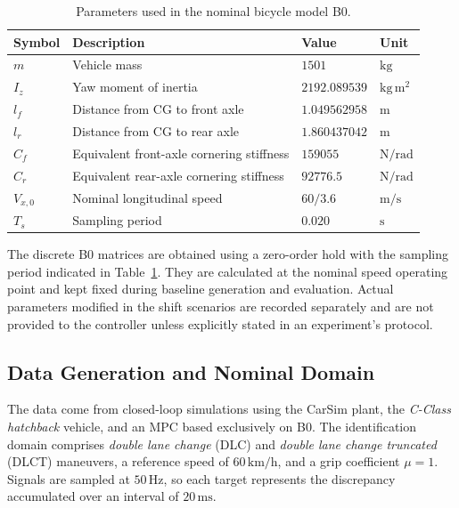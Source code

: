\documentclass[12pt,a4paper]{report}
\begin{document}
\begin{table}[htbp]
    \centering
    \caption{Parameters used in the nominal bicycle model B0.}
    \label{tab:bicycle_parameters}
    \begin{tabular}{@{}llll@{}}
        \toprule
        Symbol & Description & Value & Unit \\
        \midrule
        $m$ & Vehicle mass
            & $1501$ & $\mathrm{kg}$ \\
        $I_z$ & Yaw moment of inertia
            & $2192.089539$ & $\mathrm{kg\,m^2}$ \\
        $l_f$ & Distance from CG to front axle
            & $1.049562958$ & $\mathrm{m}$ \\
        $l_r$ & Distance from CG to rear axle
            & $1.860437042$ & $\mathrm{m}$ \\
        $C_f$ & Equivalent front-axle cornering stiffness
            & $159055$ & $\mathrm{N/rad}$ \\
        $C_r$ & Equivalent rear-axle cornering stiffness
            & $92776.5$ & $\mathrm{N/rad}$ \\
        $V_{x,0}$ & Nominal longitudinal speed
            & $60/3.6$ & $\mathrm{m/s}$ \\
        $T_s$ & Sampling period
            & $0.020$ & $\mathrm{s}$ \\
        \bottomrule
    \end{tabular}
\end{table}

The discrete B0 matrices are obtained using a zero-order hold with the sampling period indicated in Table~\ref{tab:bicycle_parameters}. They are calculated at the nominal speed operating point and kept fixed during baseline generation and evaluation. Actual parameters modified in the shift scenarios are recorded separately and are not provided to the controller unless explicitly stated in an experiment's protocol.

\subsection{Data Generation and Nominal Domain}

The data come from closed-loop simulations using the CarSim plant, the \textit{C-Class hatchback} vehicle, and an MPC based exclusively on B0. The identification domain comprises \textit{double lane change} (DLC) and \textit{double lane change truncated} (DLCT) maneuvers, a reference speed of $60\,\mathrm{km/h}$, and a grip coefficient $\mu=1$. Signals are sampled at $50\,\mathrm{Hz}$, so each target represents the discrepancy accumulated over an interval of $20\,\mathrm{ms}$.
\end{document}
